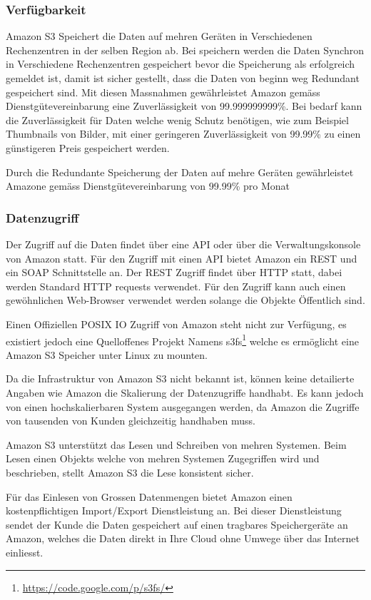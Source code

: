 \subsubsection*{Verfügbarkeit}
Amazon S3 Speichert die Daten auf mehren Geräten in Verschiedenen Rechenzentren in der selben Region ab. Bei speichern werden die Daten Synchron in Verschiedene Rechenzentren gespeichert bevor die Speicherung als erfolgreich gemeldet ist, damit ist sicher gestellt, dass die Daten von beginn weg Redundant gespeichert sind. Mit diesen Massnahmen gewährleistet Amazon gemäss Dienstgütevereinbarung eine Zuverlässigkeit von 99.999999999\%. Bei bedarf kann die Zuverlässigkeit für Daten welche wenig Schutz benötigen, wie zum Beispiel Thumbnails von Bilder, mit einer geringeren Zuverlässigkeit von 99.99\% zu einen günstigeren Preis gespeichert werden. \cite{Amazon2007}

Durch die Redundante Speicherung der Daten auf mehre Geräten gewährleistet Amazone gemäss Dienstgütevereinbarung von 99.99\% pro Monat

\subsubsection*{Datenzugriff}
Der Zugriff auf die Daten findet über eine API oder über die Verwaltungskonsole von Amazon statt. Für den Zugriff mit einen API bietet Amazon ein \gls{REST} und ein \gls{SOAP} Schnittstelle an. Der \gls{REST} Zugriff findet über HTTP statt, dabei werden Standard HTTP requests verwendet. Für den Zugriff kann auch einen gewöhnlichen Web-Browser verwendet werden solange die Objekte Öffentlich sind.

Einen Offiziellen POSIX IO Zugriff von Amazon steht nicht zur Verfügung, es existiert jedoch eine Quelloffenes Projekt Namens s3fs\footnote{\url{https://code.google.com/p/s3fs/}} welche es ermöglicht eine Amazon S3 Speicher unter Linux zu mounten. \cite{S3fs}

Da die Infrastruktur von Amazon S3 nicht bekannt ist, können keine detailierte Angaben wie Amazon die Skalierung der Datenzugriffe handhabt. Es kann jedoch von einen hochskalierbaren System ausgegangen werden, da Amazon die Zugriffe von tausenden von Kunden gleichzeitig handhaben muss.

Amazon S3 unterstützt das Lesen und Schreiben von mehren Systemen. Beim Lesen einen Objekts welche von mehren Systemen Zugegriffen wird und beschrieben, stellt Amazon S3 die Lese konsistent sicher. \cite{Amazon2012a}

Für das Einlesen von Grossen Datenmengen bietet Amazon einen kostenpflichtigen Import/Export Dienstleistung an. Bei dieser Dienstleistung sendet der Kunde die Daten gespeichert auf einen tragbares Speichergeräte an Amazon, welches die Daten direkt in Ihre Cloud ohne Umwege über das Internet einliesst.


